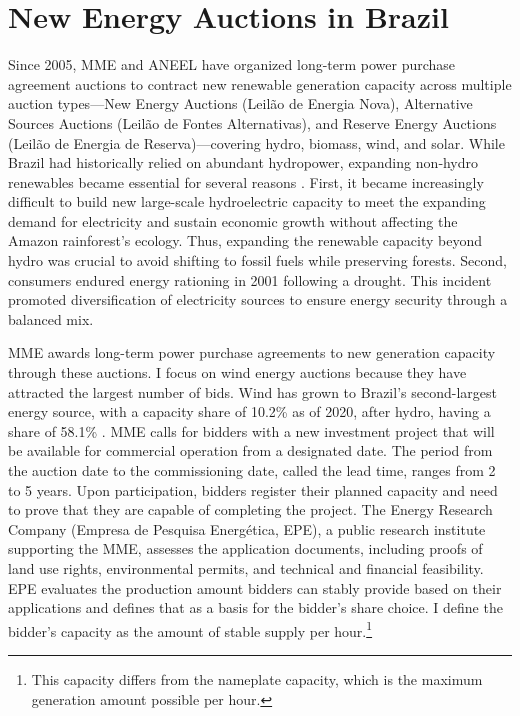 \documentclass[12pt]{article}
\theoremstyle{definition} %
\begin{document}
\section{New Energy Auctions in Brazil}
\label{sec:contextdata}


Since 2005, MME and ANEEL have organized long-term power purchase agreement auctions to contract new renewable generation capacity across multiple auction types---New Energy Auctions (Leil\~ao de Energia Nova), Alternative Sources Auctions (Leil\~ao de Fontes Alternativas), and Reserve Energy Auctions (Leil\~ao de Energia de Reserva)---covering hydro, biomass, wind, and solar. While Brazil had historically relied on abundant hydropower, expanding non‑hydro renewables became essential for several reasons \citep{Werner2023}. First, it became increasingly difficult to build new large-scale hydroelectric capacity to meet the expanding demand for electricity and sustain economic growth without affecting the Amazon rainforest's ecology. Thus, expanding the renewable capacity beyond hydro was crucial to avoid shifting to fossil fuels while preserving forests. Second, consumers endured energy rationing in 2001 following a drought. This incident promoted diversification of electricity sources to ensure energy security through a balanced mix.

MME awards long-term power purchase agreements to new generation capacity through these auctions. I focus on wind energy auctions because they have attracted the largest number of bids. Wind has grown to Brazil's second-largest energy source, with a capacity share of 10.2\% as of 2020, after hydro, having a share of 58.1\% \citep{Tolmasquim2021}. MME calls for bidders with a new investment project that will be available for commercial operation from a designated date. The period from the auction date to the commissioning date, called the lead time, ranges from 2 to 5 years. Upon participation, bidders register their planned capacity and need to prove that they are capable of completing the project. The Energy Research Company (Empresa de Pesquisa Energ\'etica, EPE), a public research institute supporting the MME, assesses the application documents, including proofs of land use rights, environmental permits, and technical and financial feasibility. EPE evaluates the production amount bidders can stably provide based on their applications and defines that as a basis for the bidder's share choice. I define the bidder's capacity as the amount of stable supply per hour.\footnote{
This capacity differs from the nameplate capacity, which is the maximum generation amount possible per hour.
}
\end{document}
